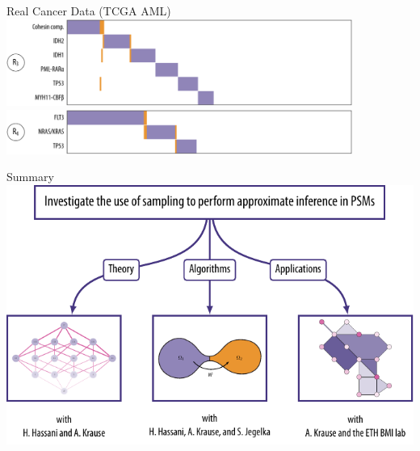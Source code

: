 \documentclass[mathserif]{beamer}
\begin{document}
\begin{frame}{Real Cancer Data (TCGA AML)}
\vspace{1em}
\centering
\includegraphics[width=0.85\textwidth]{figures/aml_3.pdf}\\[2em]
\includegraphics[width=0.85\textwidth]{figures/aml_4.pdf}
\end{frame}

\begin{frame}{Summary}
\vspace{1em}
\centering
\includegraphics[width=\textwidth]{figures/chapters_end.pdf}%
\end{frame}
\end{document}
